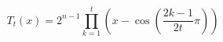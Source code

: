 \begin{equation}
T_{t}(x) = 2^{n-1} \prod \limits_{k=1}^{t} \left(x - \cos(\frac{2k-1}{2t}\pi) \right)
\label{Cheby1_n}
\end{equation}

